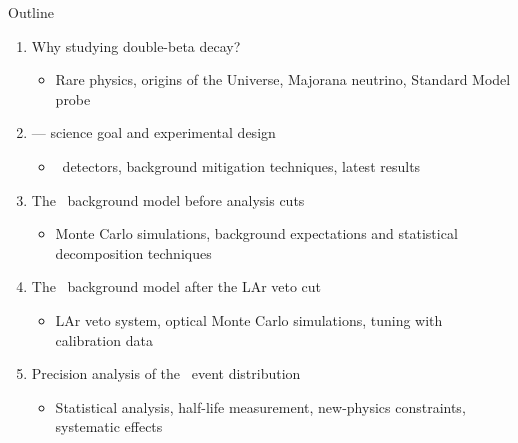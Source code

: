 \documentclass[10pt,aspectratio=169]{beamer}
\begin{document}
\begin{frame}{Outline}
  \begin{enumerate}
    \item Why studying \alert{double-beta} decay?
      \begin{itemize}
        \item Rare physics, origins of the Universe, Majorana neutrino, Standard Model probe
      \end{itemize}
    \item \alert{\gerda} --- science goal and experimental design
      \begin{itemize}
        \item \gesix\ detectors, background mitigation techniques, latest results
      \end{itemize}
    \item The \gerda\ \alert{background model} before analysis cuts
      \begin{itemize}
        \item Monte Carlo simulations, background expectations and statistical decomposition techniques
      \end{itemize}
    \item The \gerda\ background model \alert{after the LAr veto cut}
      \begin{itemize}
        \item LAr veto system, optical Monte Carlo simulations, tuning with calibration data
      \end{itemize}
    \item Precision analysis of the \alert{\nnbb\ event distribution}
    \begin{itemize}
      \item Statistical analysis, half-life measurement, new-physics constraints, systematic effects
    \end{itemize}
  \end{enumerate}
\end{frame}
\end{document}
